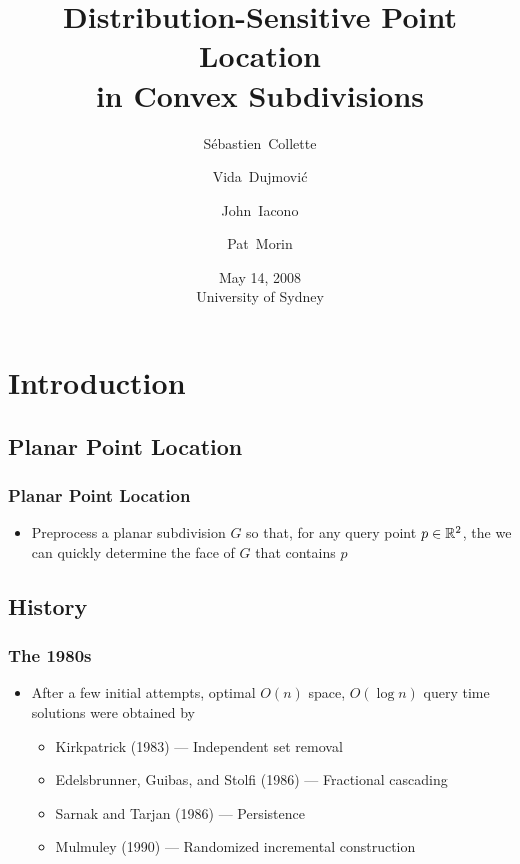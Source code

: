 \documentclass{beamer}
\title{Distribution-Sensitive Point Location\\ in Convex Subdivisions}
\author{S\'ebastien~Collette 
	\and Vida~Dujmovi\'c 
	\and John~Iacono
	\and Pat~Morin}
\date{May 14, 2008 \\ University of Sydney}
\begin{document}
\frame{\titlepage}

\section[Outline]{}
\frame{\tableofcontents}

\section{Introduction}
\subsection{Planar Point Location}
\frame
{
  \frametitle{Planar Point Location}
  \begin{itemize}
  \item Preprocess a planar subdivision $G$ so that, for any query
point $p\in\mathbb{R}^2$, the we can quickly determine the face of $G$
that contains $p$
  \begin{center}
  \end{center}
  \end{itemize}
}

\subsection{History}

\frame
{
  \frametitle{The 1980s}
  \begin{itemize}
  \item<1-> After a few initial attempts, optimal $O(n)$ space, $O(\log
n)$ query time solutions were obtained by
  \begin{itemize}
   \item<2-> Kirkpatrick (1983) --- Independent set removal
   \item<3-> Edelsbrunner, Guibas, and Stolfi (1986) --- Fractional cascading
   \item<4-> Sarnak and Tarjan (1986) --- Persistence
   \item<5-> Mulmuley (1990) --- Randomized incremental construction
  \end{itemize}
  \end{itemize}
}
\end{document}

